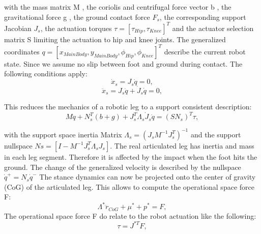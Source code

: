 \documentclass[journal,onecolumn]{IEEEtran}
\begin{document}
	with the mass matrix M , the coriolis and centrifugal force vector b , the gravitational force g , the ground contact force
	$F_s$, the corresponding support Jacobian \({J}_{s}\), the actuation torques \(\tau = [{\tau}_{Hip}, {\tau}_{Knee}]^{T}\) and the actuator selection matrix S
	limiting the actuation to hip and knee joints. The generalized coordinates  \(q = [x_{MainBody}, y_{MainBody}, {\phi}_{Hip}, {\phi}_{Knee}]^{T}\)
	describe the current robot state. Since we assume no slip between foot and ground during contact. The following conditions apply: 
	\begin{equation}
	\dot{x}_{s} = J_{s} \dot{q} = 0,
	\end{equation}
	\begin{equation}
	\ddot{x}_{s} = J_{s} \ddot{q} + \dot{J}_{s} \dot{q}=0,
	\end{equation}
	
	This reduces the mechanics of a robotic leg to a support consistent description:
	\begin{equation}
	M \ddot{q} + {N}_{s}^{T}(b + g) + {J}_{s}^{T} {\Lambda}_{s} {\dot{J}}_{s} \dot{q} = {(S {N}_{s})}^{T} \tau,
	\end{equation}
	
	with the support space inertia Matrix \({\Lambda}_{s} = {({J}_{s} {M}^{-1} {J}_{s}^{T})}^{-1}\) and the support nullspace 
	\({N}{s}=[I-{M}^{-1} {J}_{s}^{T} {\Lambda}_{s} {J}_{s}]\). The real articulated leg has inertia and mass in each leg segment. Therefore it is affected 
	by the impact when the foot hits the ground. The change of the generalized velocity is described by the nullspace \({\dot{q}}^{+}={N}_{s} {\dot{q}}^{-}\)
	The stance dynamics can now be projected onto the center of gravity (CoG) of the articulated leg. This allows to compute the operational space force F:
	\begin{equation}
	{\Lambda}^{*} {\ddot{r}}_{CoG} + {\mu}^{*} + {p}^{*} = F, 
	\label{eq:operational space force F}
	\end{equation}
	The operational space force F do relate to the robot actuation like the following:
	\begin{equation}
	\tau = {J}^{*T}F,
	\label{eq:tau from operational space force F}
	\end{equation}
	
\end{document}
